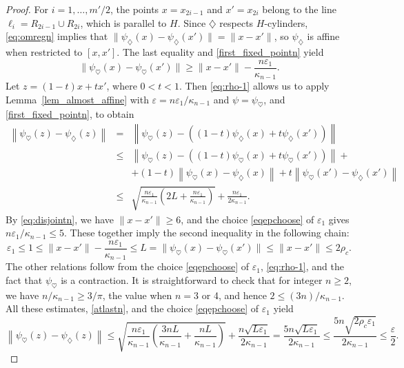 \documentclass[10pt,a4paper]{amsart}
\newcommand{\di}{\diamondsuit}
\newcommand{\ee}{\varepsilon}
\begin{document}
\begin{proof}
For $i=1,\dots,m'/2$, the points $x=x_{2i-1}$ and $x'=x_{2i}$ belong to the line $\ell_i=R_{2i-1}\cup R_{2i}$, which is parallel to $H$. Since $\di$ respects $H$-cylinders, \eqref{eq:omregn} implies that $\|\psi_\di(x)-\psi_\di(x')\|=\|x-x'\|$, so $\psi_\di$ is affine when restricted to $[x,x']$.  The last equality and \eqref{first_fixed_pointn} yield
\begin{equation}\label{eq:rho-1}
\|\psi_{\heartsuit}(x)-\psi_{\heartsuit}(x')\|\ge \|x-x'\|-\frac{n\ee_1}{\kappa_{n-1}}.
\end{equation}
Let $z=(1-t)x+tx'$, where $0<t<1$.  Then \eqref{eq:rho-1} allows us to apply Lemma~\ref{lem_almost_affine} with $\ee=n\ee_1/\kappa_{n-1}$ and $\psi=\psi_{\heartsuit}$, and \eqref{first_fixed_pointn}, to obtain
\begin{eqnarray}
\left\|	\psi_{\heartsuit}(z)-\psi_{\di}(z)\right\|
&=& \left\|	\psi_{\heartsuit}(z)-((1-t)\psi_{\di}(x)+t\psi_{\di}(x'))\right\|\nonumber\\
&\le& \left\|\psi_{\heartsuit}(z)-((1-t)\psi_{\heartsuit}(x)
+t\psi_{\heartsuit}(x'))\right\|+\nonumber\\
& &+(1-t)\left\|\psi_{\heartsuit}(x)-\psi_{\di}(x)\right\|+
t\left\|\psi_{\heartsuit}(x')-\psi_{\di}(x')\right\|\nonumber\\
&\le &\sqrt{\frac{n\ee_1}{\kappa_{n-1}}\left(2L+\frac{n\ee_1}{\kappa_{n-1}}
\right)}+\frac{n\ee_1}{2\kappa_{n-1}}.
\label{atlastn}
\end{eqnarray}
By \eqref{eq:disjointn}, we have $\|x-x'\|\ge 6$, and the choice \eqref{eqepchoose} of $\ee_1$ gives $n\ee_1/\kappa_{n-1}\le 5$.  These together imply the second inequality in the following chain:
\[
\ee_1\le 1\le \|x-x'\|-\frac{n\ee_1}{\kappa_{n-1}}\le L=\|\psi_{\heartsuit}(x)-\psi_{\heartsuit}(x')\|\le \|x-x'\|\le 2\rho_c.
\]
The other relations follow from the choice \eqref{eqepchoose} of $\ee_1$, \eqref{eq:rho-1}, and the fact that $\psi_\heartsuit$ is a contraction.  It is straightforward to check that for integer $n\ge 2$, we have $n/\kappa_{n-1}\ge 3/\pi$, the value when $n=3$ or 4, and hence $2\le (3n)/\kappa_{n-1}$.  All these estimates,  \eqref{atlastn}, and the choice \eqref{eqepchoose} of $\ee_1$ yield
\begin{equation}\label{eq6425}\left\|	\psi_{\heartsuit}(z)-\psi_{\di}(z)\right\|\le\sqrt{\frac{n\ee_1}{\kappa_{n-1}}\left(\frac{3nL}{\kappa_{n-1}}
+\frac{nL}{\kappa_{n-1}}\right)}+\frac{n\sqrt{L\ee_1}}{2\kappa_{n-1}}
= \frac{5n\sqrt{L\ee_1}}{2\kappa_{n-1}}\le \frac{5n\sqrt{2\rho_c\ee_1}}{2\kappa_{n-1}}\le\frac{\ee}{2}.
\end{equation}


\end{proof}
\end{document}
